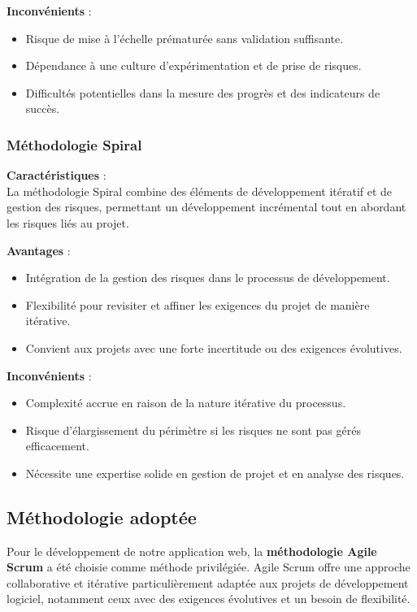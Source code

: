 \textbf{Inconvénients} :
\begin{itemize}
    \item Risque de mise à l’échelle prématurée sans validation suffisante.
    \item Dépendance à une culture d'expérimentation et de prise de risques.
    \item Difficultés potentielles dans la mesure des progrès et des indicateurs de succès.
\end{itemize}

\subsubsection*{Méthodologie Spiral}
\textbf{Caractéristiques} :\\
La méthodologie Spiral combine des éléments de développement itératif et de gestion des risques, permettant un développement incrémental tout en abordant les risques liés au projet.

\textbf{Avantages} :
\begin{itemize}
    \item Intégration de la gestion des risques dans le processus de développement.
    \item Flexibilité pour revisiter et affiner les exigences du projet de manière itérative.
    \item Convient aux projets avec une forte incertitude ou des exigences évolutives.
\end{itemize}

\textbf{Inconvénients} :
\begin{itemize}
    \item Complexité accrue en raison de la nature itérative du processus.
    \item Risque d'élargissement du périmètre si les risques ne sont pas gérés efficacement.
    \item Nécessite une expertise solide en gestion de projet et en analyse des risques.
\end{itemize}

\subsection{Méthodologie adoptée}

Pour le développement de notre application web, la \textbf{méthodologie Agile Scrum} a été choisie comme méthode privilégiée. Agile Scrum offre une approche collaborative et itérative particulièrement adaptée aux projets de développement logiciel, notamment ceux avec des exigences évolutives et un besoin de flexibilité.

